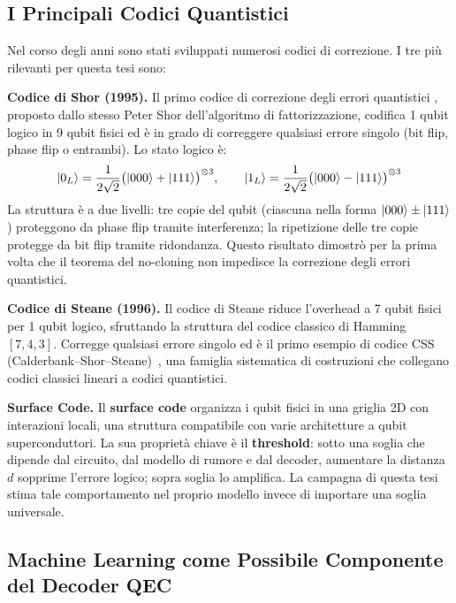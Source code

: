 \begin{onehalfspace}
\subsection{I Principali Codici Quantistici}

Nel corso degli anni sono stati sviluppati numerosi codici di correzione. I tre più rilevanti per questa tesi sono:

\textbf{Codice di Shor (1995).}
Il primo codice di correzione degli errori quantistici \cite{shorcorrection1995}, proposto dallo stesso Peter Shor dell'algoritmo di fattorizzazione, codifica 1 qubit logico in 9 qubit fisici ed è in grado di correggere qualsiasi errore singolo (bit flip, phase flip o entrambi). Lo stato logico è:
\begin{equation}
    \ket{0_L} = \frac{1}{2\sqrt{2}}\bigl(\ket{000}+\ket{111}\bigr)^{\otimes 3}, \qquad
    \ket{1_L} = \frac{1}{2\sqrt{2}}\bigl(\ket{000}-\ket{111}\bigr)^{\otimes 3}
\end{equation}
La struttura è a due livelli: tre copie del qubit (ciascuna nella forma $\ket{000}\pm\ket{111}$) proteggono da phase flip tramite interferenza; la ripetizione delle tre copie protegge da bit flip tramite ridondanza. Questo risultato dimostrò per la prima volta che il teorema del no-cloning non impedisce la correzione degli errori quantistici.

\textbf{Codice di Steane (1996).}
Il codice di Steane \cite{steane1996} riduce l'overhead a 7 qubit fisici per 1 qubit logico, sfruttando la struttura del codice classico di Hamming $[7,4,3]$. Corregge qualsiasi errore singolo ed è il primo esempio di codice CSS (Calderbank--Shor--Steane)~\cite{calderbankShor1996}, una famiglia sistematica di costruzioni che collegano codici classici lineari a codici quantistici.

\textbf{Surface Code.}
Il \textbf{surface code} \cite{fowler2012} organizza i qubit fisici in una griglia 2D con interazioni locali, una struttura compatibile con varie architetture a qubit superconduttori. La sua proprietà chiave è il \textbf{threshold}: sotto una soglia che dipende dal circuito, dal modello di rumore e dal decoder, aumentare la distanza $d$ sopprime l'errore logico; sopra soglia lo amplifica. La campagna di questa tesi stima tale comportamento nel proprio modello invece di importare una soglia universale.


\subsection{Machine Learning come Possibile Componente del Decoder QEC}
\label{sec:qec_ml}


\end{onehalfspace}
